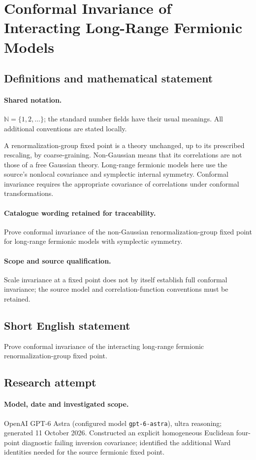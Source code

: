 \documentclass[11pt]{article}
\begin{document}
\section{Conformal Invariance of Interacting Long-Range Fermionic Models}\label{statement}

\subsection{Definitions and mathematical statement}

\paragraph{Shared notation.}$\mathbb N=\{1,2,\ldots\}$; the standard number fields have their usual meanings. All additional conventions are stated locally.


A renormalization-group fixed point is a theory unchanged, up to its prescribed rescaling, by coarse-graining. Non-Gaussian means that its correlations are not those of a free Gaussian theory. Long-range fermionic models here use the source's nonlocal covariance and symplectic internal symmetry. Conformal invariance requires the appropriate covariance of correlations under conformal transformations.

\paragraph{Catalogue wording retained for traceability.}
Prove conformal invariance of the non-Gaussian renormalization-group fixed point for long-range fermionic models with symplectic symmetry.

\paragraph{Scope and source qualification.}Scale invariance at a fixed point does not by itself establish full conformal invariance; the source model and correlation-function conventions must be retained.
\subsection{Short English statement}
Prove conformal invariance of the interacting long-range fermionic renormalization-group fixed point.
\subsection{Research attempt}
\paragraph{Model, date and investigated scope.}
OpenAI GPT-6 Astra (configured model \texttt{gpt-6-astra}), ultra reasoning; generated 11 October 2026. Constructed an explicit homogeneous Euclidean four-point diagnostic failing inversion covariance; identified the additional Ward identities needed for the source fermionic fixed point.
\end{document}
